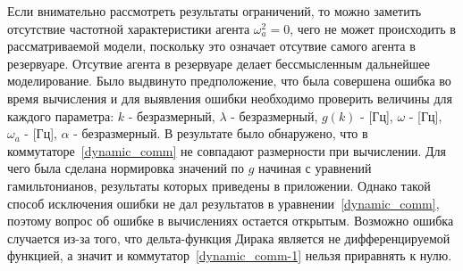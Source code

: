 Если внимательно рассмотреть результаты ограничений, то можно заметить отсутствие частотной характеристики
агента $\omega^{2}_{a} = 0$, чего не может происходить в рассматриваемой модели, поскольку это означает
отсутвие самого агента в резервуаре.
Отсутвие агента в резервуаре делает бессмысленным дальнейшее моделирование.
Было выдвинуто предположение, что была совершена ошибка во время вычисления и для выявления ошибки
необходимо проверить величины для каждого параметра: $k$ - безразмерный, $\lambda$ - безразмерный,
$g(k)$ - [Гц], $\omega$ - [Гц], $\omega_{a}$ - [Гц], $\alpha$ - безразмерный.
В результате было обнаружено, что в коммутаторе~\eqref{dynamic_comm} не совпадают размерности при вычислении.
Для чего была сделана нормировка значений по $g$ начиная с уравнений гамильтонианов, результаты которых
приведены в приложении.
Однако такой способ исключения ошибки не дал результатов в уравнении~\eqref{dynamic_comm}, поэтому
вопрос об ошибке в вычислениях остается открытым.
Возможно ошибка случается из-за того, что дельта-функция Дирака является не дифференцируемой функцией,
а значит и коммутатор~\eqref{dynamic_comm-1} нельзя приравнять к нулю.


